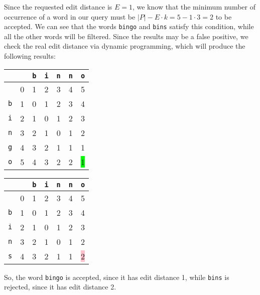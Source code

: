 %
Since the requested edit distance is $E = 1$, we know that the minimum number of
occurrence of a word in our query must be $|P| - E \cdot k = 5 - 1 \cdot 3 = 2$
to be accepted. We can see that the words \texttt{bingo} and \texttt{bins}
satisfy this condition, while all the other words will be filtered. Since the
results may be a false positive, we check the real edit distance via dynamic
programming, which will produce the following results:
%
\begin{table}[H]
  \centering
  \begin{tabular}{c|c|c|c|c|c|c|}
            &   & {\tt b} & {\tt i} & {\tt n} & {\tt n} & {\tt o} \\ \hline
            & 0 &    1    &    2    &    3    &    4    &    5 \\ \hline
    {\tt b} & 1 &    0    &    1    &    2    &    3    &    4 \\ \hline
    {\tt i} & 2 &    1    &    0    &    1    &    2    &    3 \\ \hline
    {\tt n} & 3 &    2    &    1    &    0    &    1    &    2 \\ \hline
    {\tt g} & 4 &    3    &    2    &    1    &    1    &    1 \\ \hline
    {\tt o} & 5 &    4    &    3    &    2    &    2    & \colorbox{lime}{1} \\
    \hline
  \end{tabular}
  \quad\quad
  \begin{tabular}{c|c|c|c|c|c|c|}
            &   & {\tt b} & {\tt i} & {\tt n} & {\tt n} & {\tt o} \\ \hline
            & 0 &    1    &    2    &    3    &    4    &    5 \\ \hline
    {\tt b} & 1 &    0    &    1    &    2    &    3    &    4 \\ \hline
    {\tt i} & 2 &    1    &    0    &    1    &    2    &    3 \\ \hline
    {\tt n} & 3 &    2    &    1    &    0    &    1    &    2 \\ \hline
    {\tt s} & 4 &    3    &    2    &    1    &    1    & \colorbox{pink}{2} \\
    \hline
  \end{tabular}
\end{table}
%
So, the word \texttt{bingo} is accepted, since it has edit distance 1, while
\texttt{bins} is rejected, since it has edit distance 2.
